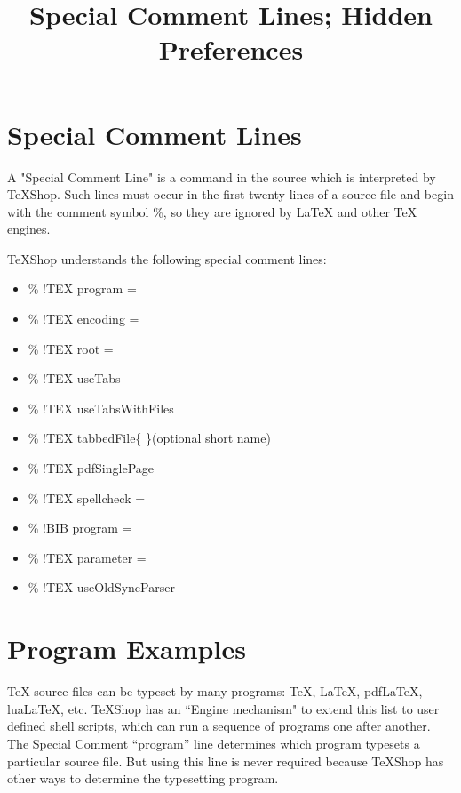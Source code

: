 \documentclass[11pt, oneside]{article}   	%
\title{Special Comment Lines; Hidden Preferences}
\date{}							%
\begin{document}
\maketitle
\section{Special Comment Lines}
A "Special Comment Line" is a command in the source which is interpreted by TeXShop. Such lines must occur in the first twenty lines of a source file and begin with the comment symbol \%, so they are ignored by LaTeX and other TeX engines.

TeXShop understands the following special comment lines:

\begin{itemize}
\item \% !TEX program =
\item \% !TEX encoding =
\item \% !TEX root =
\item \% !TEX useTabs
\item \% !TEX useTabsWithFiles
\item \% !TEX tabbedFile\{ \}(optional short name)
\item \% !TEX pdfSinglePage
\item \% !TEX spellcheck =
\item \% !BIB program =
\item \% !TEX parameter =
\item \% !TEX useOldSyncParser
\end{itemize}

\section{Program Examples}

TeX source files can be typeset by many programs: TeX, LaTeX, pdfLaTeX, luaLaTeX, etc. TeXShop has an ``Engine mechanism" to extend this list to user defined shell scripts, which can run a sequence of programs one after another. The Special Comment ``program'' line determines which program typesets a particular source file. But using this line is never required because TeXShop has other ways to determine the typesetting program.
\end{document}
